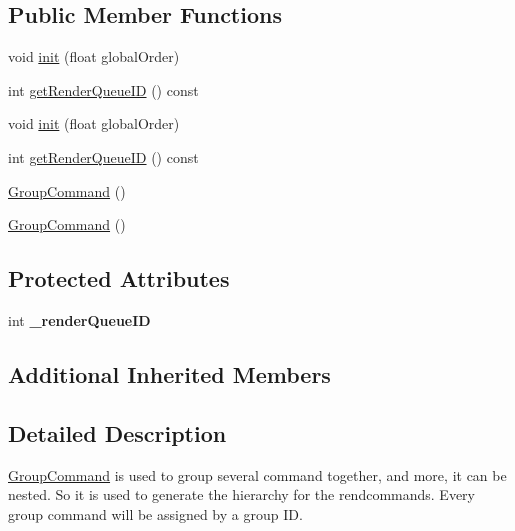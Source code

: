 \subsection*{Public Member Functions}
\begin{DoxyCompactItemize}
\item 
void \hyperlink{classGroupCommand_a1764751efbb8a4baeb0753f9f89fde10}{init} (float global\+Order)
\item 
int \hyperlink{classGroupCommand_adc611e80f004b605a81ec5ac6a3f0230}{get\+Render\+Queue\+ID} () const
\item 
void \hyperlink{classGroupCommand_a1764751efbb8a4baeb0753f9f89fde10}{init} (float global\+Order)
\item 
int \hyperlink{classGroupCommand_adc611e80f004b605a81ec5ac6a3f0230}{get\+Render\+Queue\+ID} () const
\end{DoxyCompactItemize}
\textbf{ }\par
\begin{DoxyCompactItemize}
\item 
\hyperlink{classGroupCommand_aa243a9a0c1d72c54277ef0d5ab95866a}{Group\+Command} ()
\end{DoxyCompactItemize}

\textbf{ }\par
\begin{DoxyCompactItemize}
\item 
\hyperlink{classGroupCommand_aa243a9a0c1d72c54277ef0d5ab95866a}{Group\+Command} ()
\end{DoxyCompactItemize}

\subsection*{Protected Attributes}
\begin{DoxyCompactItemize}
\item 
\mbox{\label{classGroupCommand_a22b66afc7451e81dd4039c13b921e9aa}} 
int {\bfseries \+\_\+render\+Queue\+ID}
\end{DoxyCompactItemize}
\subsection*{Additional Inherited Members}


\subsection{Detailed Description}
\hyperlink{classGroupCommand}{Group\+Command} is used to group several command together, and more, it can be nested. So it is used to generate the hierarchy for the rendcommands. Every group command will be assigned by a group ID. 

